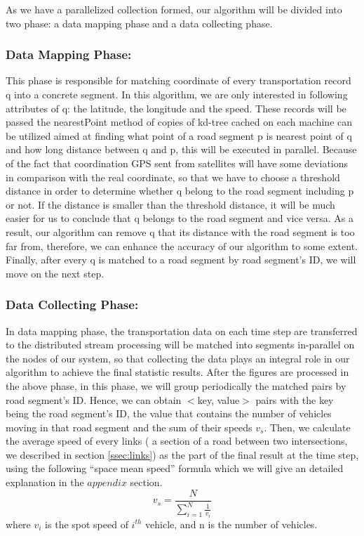 \documentclass{acm_proc_article-sp}
\begin{document}
\setlength{\parindent}{0.7cm} As we have a parallelized collection formed, our algorithm will be divided into two phase: a data mapping phase and a data collecting phase. 

\subsubsection{Data Mapping Phase:} 
This phase is responsible for matching coordinate of every transportation record q into a concrete segment. In this algorithm, we are only interested in following attributes of q: the latitude, the longitude and the speed. These records will be passed the nearestPoint method of copies of kd-tree cached on each machine can be utilized aimed at finding what point of a road segment p is nearest point of q and how long distance between q and p, this will be executed in parallel. Because of the fact that coordination GPS sent from satellites will have some deviations in comparison with the real coordinate, so that we have to choose a threshold distance in order to determine whether q belong to the road segment including p or not. If the distance is smaller than the threshold distance, it will be much easier for us to conclude that q belongs to the road segment and vice versa. As a result, our algorithm can remove q that its distance with the road segment is too far from, therefore, we can enhance the accuracy of our algorithm to some extent. Finally, after every q is matched to a road segment by road segment's ID, we will move on the next step.

\subsubsection{Data Collecting Phase:} \label{datacollectingphase} In data mapping phase, the transportation data on each time step are transferred to the distributed stream processing will be matched into segments in-parallel on the nodes of our system, so that collecting the data plays an integral role in our algorithm to achieve the final statistic results.  After the figures are processed in the above phase, in this phase, we will group periodically the matched pairs by road segment's ID. Hence, we can obtain $<$key, value$>$ pairs with the key being the road segment's ID, the value that contains the number of vehicles moving in that road segment and the sum of their speeds $v_{s}$. Then, we calculate the average speed of every links ( a section of a road between two intersections, we described in section \ref{ssec:links}) as the part of the final result at the time step, using the following ``space mean speed'' formula which we will give an detailed explanation in the $appendix$ section.
\[ v_{s} = \frac{N}{\sum_{i=1}^{N}\frac{1}{v_{i}}}\]
where $v_{i}$ is the spot speed of $i^{th}$ vehicle, and n is the number of vehicles.
\end{document}
